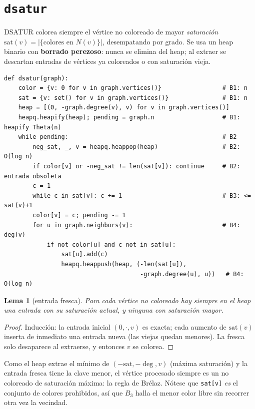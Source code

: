 \documentclass[11pt,a4paper]{article}
\newtheorem{lema}[teorema]{Lema}
\theoremstyle{definition}
\theoremstyle{remark}
\newcommand{\dg}{\operatorname{deg}}
\begin{document}
\section{\texttt{dsatur}}\label{sec:dsatur}
DSATUR colorea siempre el vértice no coloreado de mayor \emph{saturación}
$\mathrm{sat}(v)=|\{\text{colores en }N(v)\}|$, desempatando por grado. Se usa un
heap binario con \textbf{borrado perezoso}: nunca se elimina del heap; al extraer
se descartan entradas de vértices ya coloreados o con saturación vieja.
\begin{lstlisting}
def dsatur(graph):
    color = {v: 0 for v in graph.vertices()}                 # B1: n
    sat = {v: set() for v in graph.vertices()}               # B1: n
    heap = [(0, -graph.degree(v), v) for v in graph.vertices()]
    heapq.heapify(heap); pending = graph.n                   # B1: heapify Theta(n)
    while pending:                                           # B2
        neg_sat, _, v = heapq.heappop(heap)                  # B2: O(log n)
        if color[v] or -neg_sat != len(sat[v]): continue     # B2: entrada obsoleta
        c = 1
        while c in sat[v]: c += 1                            # B3: <= sat(v)+1
        color[v] = c; pending -= 1
        for u in graph.neighbors(v):                         # B4: deg(v)
            if not color[u] and c not in sat[u]:
                sat[u].add(c)
                heapq.heappush(heap, (-len(sat[u]),
                                      -graph.degree(u), u))   # B4: O(log n)
\end{lstlisting}

\begin{lema}[entrada fresca]\label{lema:fresca}
Para cada vértice no coloreado hay siempre en el heap una entrada con su
saturación actual, y ninguna con saturación mayor.
\end{lema}
\begin{proof}
Inducción: la entrada inicial $(0,\cdot,v)$ es exacta; cada aumento de
$\mathrm{sat}(v)$ inserta de inmediato una entrada nueva (las viejas quedan
menores). La fresca solo desaparece al extraerse, y entonces $v$ se colorea.
\end{proof}
Como el heap extrae el mínimo de $(-\mathrm{sat},-\dg,v)$ (máxima saturación) y la
entrada fresca tiene la clave menor, el vértice procesado siempre es un no
coloreado de saturación máxima: la regla de Brélaz. Nótese que \texttt{sat[v]}
\emph{es} el conjunto de colores prohibidos, así que $B_3$ halla el menor color
libre sin recorrer otra vez la vecindad.
\end{document}
